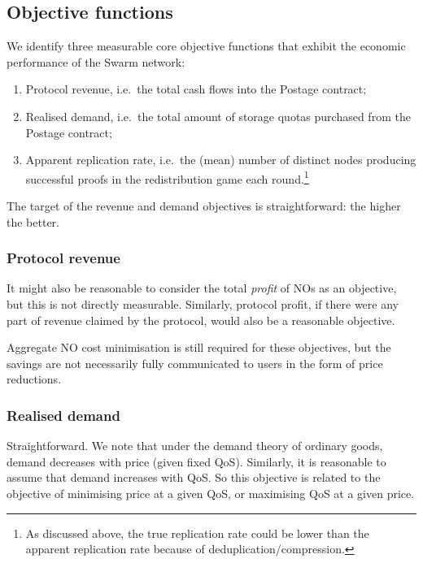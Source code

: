 \subsection{Objective functions}

We identify three measurable core objective functions that exhibit the economic performance of the Swarm network:
%
\begin{enumerate}

  \item Protocol revenue, i.e.~the total cash flows into the Postage contract;

  \item Realised demand, i.e.~the total amount of storage quotas purchased from the Postage contract;

  \item Apparent replication rate, i.e.~the (mean) number of distinct nodes producing successful proofs in the redistribution game each round.\footnote{As discussed above, the true replication rate could be lower than the apparent replication rate because of deduplication/compression.}

\end{enumerate}
%
The target of the revenue and demand objectives is straightforward: the higher the better.

\subsubsection{Protocol revenue}

It might also be reasonable to consider the total \emph{profit} of NOs as an objective, but this is not directly measurable.
%
Similarly, protocol profit, if there were any part of revenue claimed by the protocol, would also be a reasonable objective.

Aggregate NO cost minimisation is still required for these objectives, but the savings are not necessarily fully communicated to users in the form of price reductions.


\subsubsection{Realised demand}

Straightforward.
%
We note that under the demand theory of ordinary goods, demand decreases with price (given fixed QoS).
%
Similarly, it is reasonable to assume that demand increases with QoS.
%
So this objective is related to the objective of minimising price at a given QoS, or maximising QoS at a given price.

